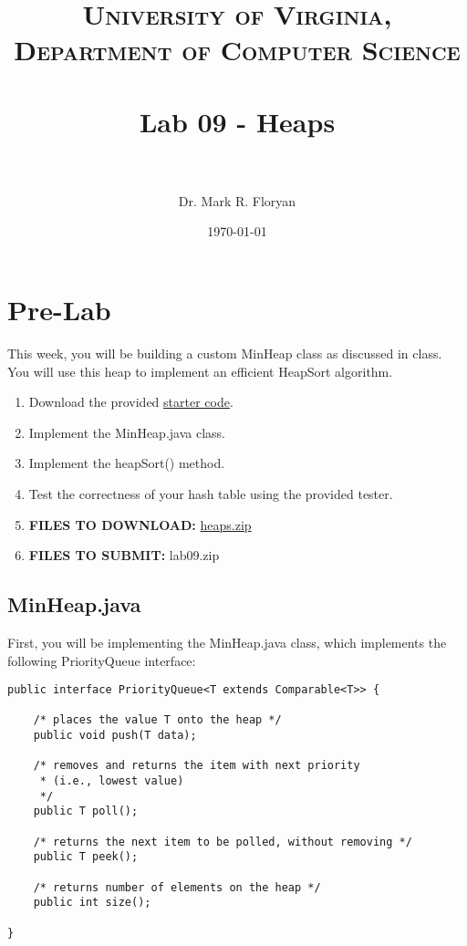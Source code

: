 \documentclass[paper=a4, fontsize=11pt, parskip=full]{scrartcl} %
\title{
\normalfont \normalsize
\textsc{University of Virginia, Department of Computer Science} \\ [25pt] %
\horrule{0.5pt} \\[0.4cm] %
\huge Lab 09 - Heaps \\ %
\horrule{2pt} \\[0.5cm] %
}
\author{Dr. Mark R. Floryan} %
\date{\normalsize\today} %
\numberwithin{equation}{section} %
\numberwithin{figure}{section} %
\numberwithin{table}{section} %
\begin{document}
\maketitle %


\section{Pre-Lab}

This week, you will be building a custom MinHeap class as discussed in class. You will use this heap to implement an efficient HeapSort algorithm. 

\begin{enumerate}
	\item Download the provided \href{https://markfloryan.github.io/dsa1/labs/lab09%20-%20Heaps/code/heaps.zip}{starter code}.
	\item Implement the MinHeap.java class.
	\item Implement the heapSort() method.
	\item Test the correctness of your hash table using the provided tester.
	\item \textbf{FILES TO DOWNLOAD:} \href{https://markfloryan.github.io/dsa1/labs/lab09%20-%20Heaps/code/heaps.zip}{heaps.zip}
	\item \textbf{FILES TO SUBMIT:} lab09.zip
\end{enumerate}


\subsection{MinHeap.java}

First, you will be implementing the MinHeap.java class, which implements the following PriorityQueue interface:

\begin{lstlisting}
public interface PriorityQueue<T extends Comparable<T>> {
	
	/* places the value T onto the heap */
	public void push(T data);

	/* removes and returns the item with next priority
     * (i.e., lowest value)
	 */
	public T poll();

	/* returns the next item to be polled, without removing */
	public T peek();

	/* returns number of elements on the heap */
	public int size();
	
}

\end{lstlisting}
\end{document}
